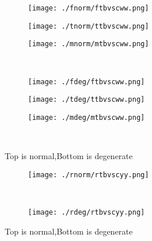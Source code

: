 \documentclass[aps,floats,floatfix,nofootinbib]{revtex4-1}
\begin{document}
\begin{center}
\begin{figure}
\begin{subfigure}{0.3\textwidth}
\texttt{[image: ./fnorm/ftbvscww.png]}
\label{}
\end{subfigure}
\begin{subfigure}{0.3\textwidth}
\texttt{[image: ./tnorm/ttbvscww.png]}
\label{}
\end{subfigure}
\begin{subfigure}{0.3\textwidth}
\texttt{[image: ./mnorm/mtbvscww.png]}
\label{}
\end{subfigure}\\
\begin{subfigure}{0.3\textwidth}
\texttt{[image: ./fdeg/ftbvscww.png]}
\label{}
\end{subfigure}
\begin{subfigure}{0.3\textwidth}
\texttt{[image: ./tdeg/ttbvscww.png]}
\label{}
\end{subfigure}
\begin{subfigure}{0.3\textwidth}
\texttt{[image: ./mdeg/mtbvscww.png]}
\label{}
\end{subfigure}\\
\caption{Top is normal,Bottom is degenerate}
\end{figure}
\end{center}

\begin{center}
\begin{figure}
\begin{subfigure}{0.95\textwidth}
\texttt{[image: ./rnorm/rtbvscyy.png]}
\label{}
\end{subfigure}\\
\begin{subfigure}{0.95\textwidth}
\texttt{[image: ./rdeg/rtbvscyy.png]}
\label{}
\end{subfigure}
\caption{Top is normal,Bottom is degenerate}
\end{figure}
\end{center}
\end{document}
